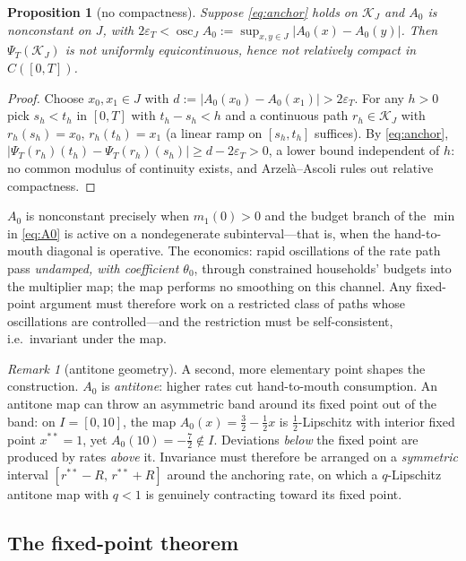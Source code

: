 \documentclass[11pt]{article}
\newtheorem{proposition}[theorem]{Proposition}
\theoremstyle{definition}
\theoremstyle{remark}
\newtheorem{remark}[theorem]{Remark}
\newcommand{\Kcal}{\mathcal{K}}
\newcommand{\psit}{\Psi_T}
\begin{document}
\begin{proposition}[no compactness]
\label{prop:notcompact}
Suppose \eqref{eq:anchor} holds on $\Kcal_J$ and $A_0$ is nonconstant
on $J$, with
$2\varepsilon_T<\operatorname{osc}_J A_0
:=\sup_{x,y\in J}|A_0(x)-A_0(y)|$. Then
$\psit(\Kcal_J)$ is not uniformly equicontinuous, hence not
relatively compact in $C([0,T])$.
\end{proposition}

\begin{proof}
Choose $x_0,x_1\in J$ with $d:=|A_0(x_0)-A_0(x_1)|>2\varepsilon_T$.
For any $h>0$ pick $s_h<t_h$ in $[0,T]$ with $t_h-s_h<h$ and a
continuous path $r_h\in\Kcal_J$ with $r_h(s_h)=x_0$,
$r_h(t_h)=x_1$ (a linear ramp on $[s_h,t_h]$ suffices). By
\eqref{eq:anchor},
$|\psit(r_h)(t_h)-\psit(r_h)(s_h)|\ge d-2\varepsilon_T>0$,
a lower bound independent of $h$: no common modulus of continuity
exists, and Arzel\`a--Ascoli rules out relative compactness.
\end{proof}

$A_0$ is nonconstant precisely when $m_1(0)>0$ and the budget branch
of the $\min$ in \eqref{eq:A0} is active on a nondegenerate
subinterval---that is, when the hand-to-mouth diagonal is operative.
The economics: rapid oscillations of the rate path pass
\emph{undamped, with coefficient $\theta_0$}, through constrained
households' budgets into the multiplier map; the map performs no
smoothing on this channel. Any fixed-point argument must therefore work on a
restricted class of paths whose oscillations are controlled---and the
restriction must be self-consistent, i.e.\ invariant under the map.

\begin{remark}[antitone geometry]\label{rem:antitone}
A second, more elementary point shapes the construction. $A_0$ is
\emph{antitone}: higher rates cut hand-to-mouth consumption. An
antitone map can throw an asymmetric band around its fixed point out
of the band: on $I=[0,10]$, the map $A_0(x)=\tfrac32-\tfrac12x$ is
$\tfrac12$-Lipschitz with interior fixed point $x^{**}=1$, yet
$A_0(10)=-\tfrac72\notin I$. Deviations \emph{below} the fixed point
are produced by rates \emph{above} it. Invariance must therefore be
arranged on a \emph{symmetric} interval $[r^{**}-R,\,r^{**}+R]$
around the anchoring rate, on which a $q$-Lipschitz antitone map with
$q<1$ is genuinely contracting toward its fixed point.
\end{remark}

\subsection{The fixed-point theorem}
\label{sec:fixedpoint}
\end{document}
